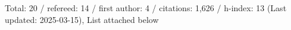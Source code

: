 Total: 20 / refereed: 14 / first author: 4 / citations: 1,626 / h-index: 13 (Last updated: 2025-03-15), List attached below